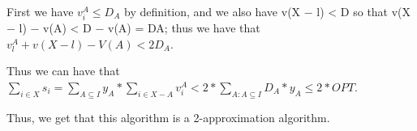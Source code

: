 \documentclass[usletter]{article}
\begin{document}
First we have  $v_i^A \le D_A$ by definition, and we also have  v(X − l) < D so that v(X − l) − v(A) < D − v(A) = DA; thus we have that $v_l^A + v(X-l) -V(A) < 2D_A$.

 Thus we can have that $\sum_{i \in X}{s_i}  = \sum_{A \subseteq I}{y_A} * \sum_{i \in X-A}{v_i^A} < 2* \sum_{A: A \subseteq I} D_A*y_A \le 2*OPT$.
 
 Thus, we get that this algorithm is a 2-approximation algorithm. 



\end{document}
